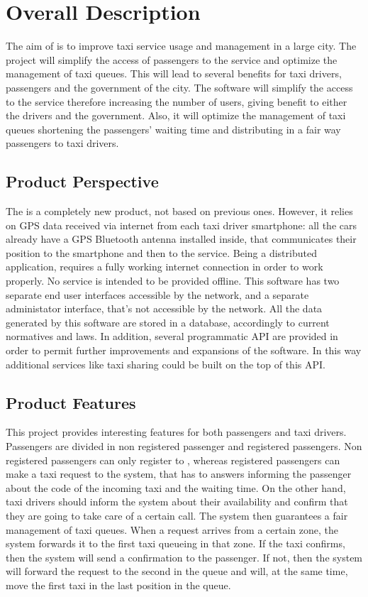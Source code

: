 \section{Overall Description}
The aim of \myTaxiService{} is to improve taxi service usage and management in a large city.
The project will simplify the access of passengers to the service and optimize the management of taxi queues.
This will lead to several benefits for taxi drivers, passengers and the government of the city.
The software will simplify the access to the service therefore increasing the number of users, giving benefit to either the drivers and the government.
Also, it will optimize the management of taxi queues shortening the passengers’ waiting time and distributing in a fair way passengers to taxi drivers.
\subsection{Product Perspective}
The \myTaxiService{} is a completely new product, not based on previous ones.
However, it relies on GPS data received via internet from each taxi driver smartphone: all the cars already have a GPS Bluetooth antenna installed inside, that communicates their position to the smartphone and then to the service.
Being a distributed application, \myTaxiService{} requires a fully working internet connection in order to work properly.
No service is intended to be provided offline.
This software has two separate end user interfaces accessible by the network, and a separate administator interface, that's not accessible by the network.
All the data generated by this software are stored in a database, accordingly to current normatives and laws.
In addition, several programmatic API are provided in order to permit further improvements and expansions of the software.
In this way additional services like taxi sharing could be built on the top of this API.
\subsection{Product Features}
This project provides interesting features for both passengers and taxi drivers.
Passengers are divided in non registered passenger and registered passengers.
Non registered passengers can only register to \myTaxiSerice{}, whereas registered passengers can make a taxi request to the system, that has to answers informing the passenger about the code of the incoming taxi and the waiting time.
On the other hand, taxi drivers should inform the system about their availability and confirm that they are going to take care of a certain call.
The system then guarantees a fair management of taxi queues.
When a request arrives from a certain zone, the system forwards it to the first taxi queueing in that zone.
If the taxi confirms, then the system will send a confirmation to the passenger.
If not, then the system will forward the request to the second in the queue and will, at the same time, move the first taxi in the last position in the queue.
